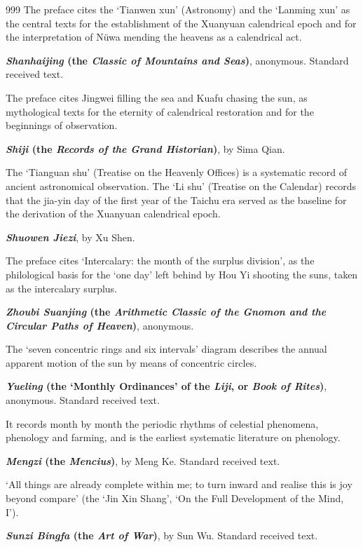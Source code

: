 \begin{thebibliography}{999}
The preface cites the `Tianwen xun' (Astronomy) and the `Lanming xun' as the central texts for the establishment of the Xuanyuan calendrical epoch and for the interpretation of N\"uwa mending the heavens as a calendrical act.

 \textbf{\textit{Shanhaijing} (the \textit{Classic of Mountains and Seas})}, anonymous. Standard received text.

The preface cites Jingwei filling the sea and Kuafu chasing the sun, as mythological texts for the eternity of calendrical restoration and for the beginnings of observation.

 \textbf{\textit{Shiji} (the \textit{Records of the Grand Historian})}, by Sima Qian.

The `Tianguan shu' (Treatise on the Heavenly Offices) is a systematic record of ancient astronomical observation. The `Li shu' (Treatise on the Calendar) records that the jia-yin day of the first year of the Taichu era served as the baseline for the derivation of the Xuanyuan calendrical epoch.

 \textbf{\textit{Shuowen Jiezi}}, by Xu Shen.

The preface cites `Intercalary: the month of the surplus division', as the philological basis for the `one day' left behind by Hou Yi shooting the suns, taken as the intercalary surplus.

 \textbf{\textit{Zhoubi Suanjing} (the \textit{Arithmetic Classic of the Gnomon and the Circular Paths of Heaven})}, anonymous.

The `seven concentric rings and six intervals' diagram describes the annual apparent motion of the sun by means of concentric circles.

 \textbf{\textit{Yueling} (the `Monthly Ordinances' of the \textit{Liji}, or \textit{Book of Rites})}, anonymous. Standard received text.

It records month by month the periodic rhythms of celestial phenomena, phenology and farming, and is the earliest systematic literature on phenology.

 \textbf{\textit{Mengzi} (the \textit{Mencius})}, by Meng Ke. Standard received text.

`All things are already complete within me; to turn inward and realise this is joy beyond compare' (the `Jin Xin Shang', `On the Full Development of the Mind, I').

 \textbf{\textit{Sunzi Bingfa} (the \textit{Art of War})}, by Sun Wu. Standard received text.


\end{thebibliography}
